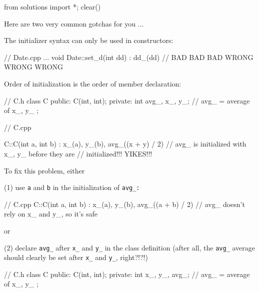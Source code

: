 \begin{python0}
from solutions import *; clear()
\end{python0}

Here are two very common gotchas for you ...

 The initializer syntax can only be used in constructors:

\begin{consolethree}[escapeinside=||]
// Date.cpp
...
void Date::set_d(int dd)
    : dd_(dd)             // BAD BAD BAD WRONG WRONG WRONG
{}
\end{consolethree}

 Order of initialization is the order of member
declaration:

\begin{consolethree}[escapeinside=||]
// C.h
class C
{
public:
    C(int, int);
private:
    int avg_, x_, y_;
    // avg_ = average of x_, y_
};
\end{consolethree}

\begin{consolethree}[escapeinside=||]
// C.cpp

C::C(int a, int b)
    : x_(a), y_(b), avg_((x + y) / 2)
// avg_ is initialized with x_, y_ before they are
// initialized!!! YIKES!!!
{}
\end{consolethree}

To fix this problem, either

(1) use \texttt{a} and \texttt{b} in the initialization of \texttt{avg\_:}

\begin{consolethree}[escapeinside=||]
// C.cpp
C::C(int a, int b)
    : x_(a), y_(b), avg_((a + b) / 2)
    // avg_ doesn't rely on x_ and y_, so it's safe
{}
\end{consolethree}

or

(2) declare \texttt{avg\_} after \texttt{x\_} and \texttt{y\_} in the class
definition (after all, the \texttt{avg\_} average should clearly be set
after \texttt{x\_} and \texttt{y\_}, right?!?!)

\begin{consolethree}[escapeinside=||]
// C.h
class C
{
public:
    C(int, int);
private:
    int x_, y_, avg_;
    // avg_ = average of x_, y_
};
\end{consolethree}


